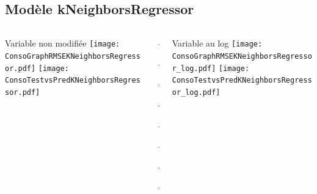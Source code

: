 \documentclass[8pt,aspectratio=169,hyperref={unicode=true}]{beamer}
\begin{document}
\subsection{Modèle kNeighborsRegressor}
\begin{frame}{\insertsubsection}
  \begin{columns}[t]
    \begin{column}{.31\textwidth}
      \centering Variable non modifiée
      \texttt{[image: ConsoGraphRMSEKNeighborsRegressor.pdf]}
      \texttt{[image: ConsoTestvsPredKNeighborsRegressor.pdf]}
    \end{column}
    \begin{column}{.38\textwidth}
      $\Longleftarrow$

      {\footnotesize
          }

      $\Longleftarrow$

      \raggedleft
      $\Longrightarrow$

      {\footnotesize
          }

      $\Longrightarrow$

      \vspace{1cm}

      \raggedright
      $\Longleftarrow$
      {\scriptsize
          }

      $\Longleftarrow$

      \raggedleft
      $\Longrightarrow$

      {\scriptsize
          
        }

      $\Longrightarrow$
    \end{column}
    \begin{column}{.31\textwidth}
      \centering Variable au log
      \texttt{[image: ConsoGraphRMSEKNeighborsRegressor\_log.pdf]}
      \texttt{[image: ConsoTestvsPredKNeighborsRegressor\_log.pdf]}
    \end{column}
  \end{columns}
\end{frame}
\end{document}
